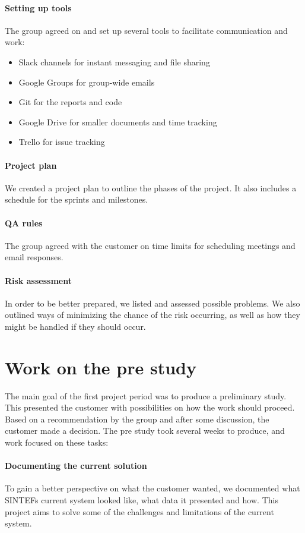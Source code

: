\documentclass[11pt,a4paper,titlepage,oneside]{report}
\begin{document}
\paragraph{Setting up tools}
The group agreed on and set up several tools to facilitate communication and work:
\begin{itemize}
	\item Slack channels for instant messaging and file sharing
	\item Google Groups for group-wide emails
	\item Git for the reports and code
	\item Google Drive for smaller documents and time tracking
	\item Trello for issue tracking
\end{itemize}

\paragraph{Project plan}
We created a project plan to outline the phases of the project. It also includes a schedule for the sprints and milestones.
	
\paragraph{QA rules}
The group agreed with the customer on time limits for scheduling meetings and email responses.

\paragraph{Risk assessment}
In order to be better prepared, we listed and assessed possible problems. We also outlined ways of minimizing the chance of the risk occurring, as well as how they might be handled if they should occur.

\section{Work on the pre study}
The main goal of the first project period was to produce a preliminary study. This presented the customer with possibilities on how the work should proceed. Based on a recommendation by the group and after some discussion, the customer made a decision. The pre study took several weeks to produce, and work focused on these tasks:

\paragraph{Documenting the current solution}
To gain a better perspective on what the customer wanted, we documented what SINTEFs current system looked like, what data it presented and how. This project aims to solve some of the challenges and limitations of the current system.
\end{document}
